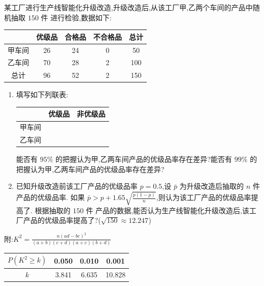 \begin{problem}
某工厂进行生产线智能化升级改造,升级改造后,从该工厂甲,乙两个车间的产品中随机抽取 \( 150\text{ 件} \) 进行检验,数据如下:

\begin{center}
\renewcommand{\arraystretch}{1.3}
\begin{tabular}{c|c|c|c|c}
 & 优级品 & 合格品 & 不合格品 & 总计 \\
\hline
甲车间 & 26 & 24 & 0 & 50 \\
\hline
乙车间 & 70 & 28 & 2 & 100 \\
\hline
总计 & 96 & 52 & 2 & 150
\end{tabular}
\end{center}

\begin{enumerate}
\item 填写如下列联表:

\begin{center}
\renewcommand{\arraystretch}{1.3}
\begin{tabular}{c|c|c}
 & 优级品 & 非优级品 \\
\hline
甲车间 &\fillinblank{}&\fillinblank{} \\
\hline
乙车间 &\fillinblank{}&\fillinblank{}
\end{tabular}
\end{center}

能否有 \( 95\% \) 的把握认为甲,乙两车间产品的优级品率存在差异?能否有 \( 99\% \) 的把握认为甲,乙两车间产品的优级品率存在差异?
\item 已知升级改造前该工厂产品的优级品率 \( p=0.5 \),设 \( \bar p \) 为升级改造后抽取的 \( n\text{ 件} \) 产品的优级品率. 如果 \( \bar p>p+1.65\sqrt{\frac{p(1-p)}{n}} \),则认为该工厂产品的优级品率提高了. 根据抽取的 \( 150\text{ 件} \) 产品的数据,能否认为生产线智能化升级改造后,该工厂产品的优级品率提高了?(\( \sqrt{150}\approx 12.247 \))
\end{enumerate}

附:\( K^2=\frac{n(ad-bc)^2}{(a+b)(c+d)(a+c)(b+d)} \)

\begin{center}
\renewcommand{\arraystretch}{1.3}
\begin{tabular}{c|c|c|c}
\( P\left( K^2\ge k \right) \) & 0.050 & 0.010 & 0.001 \\
\hline
\( k \) & 3.841 & 6.635 & 10.828
\end{tabular}
\end{center}
\end{problem}


